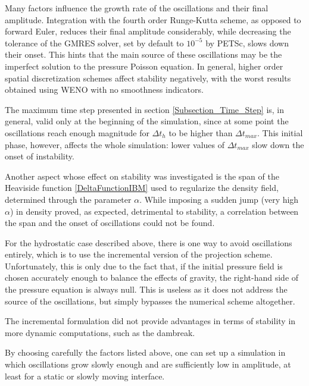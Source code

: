 \documentclass[11pt, a4paper, oneside, openany]{book}
\begin{document}
Many factors influence the growth rate of the oscillations and their final amplitude. Integration with the fourth order Runge-Kutta scheme, as opposed to forward Euler, reduces their final amplitude considerably, while decreasing the tolerance of the GMRES solver, set by default to $10^{-5}$ by PETSc, slows down their onset. This hints that the main source of these oscillations may be the imperfect solution to the pressure Poisson equation. In general, higher order spatial discretization schemes affect stability negatively, with the worst results obtained using WENO with no smoothness indicators.\par
The maximum time step presented in section \ref{Subsection_Time_Step} is, in general, valid only at the beginning of the simulation, since at some point the oscillations reach enough magnitude for $\Delta t_{h}$ to be higher than $\Delta t_{max}$. This initial phase, however, affects the whole simulation: lower values of $\Delta t_{max}$ slow down the onset of instability.\par
Another aspect whose effect on stability was investigated is the span of the Heaviside function \eqref{DeltaFunctionIBM} used to regularize the density field, determined through the parameter $\alpha$. While imposing a sudden jump (very high $\alpha$) in density proved, as expected, detrimental to stability, a correlation between the span and the onset of oscillations could not be found.\par
For the hydrostatic case described above, there is one way to avoid oscillations entirely, which is to use the incremental version of the projection scheme. Unfortunately, this is only due to the fact that, if the initial pressure field is chosen accurately enough to balance the effects of gravity, the right-hand side of the pressure equation is always null. This is useless as it does not address the source of the oscillations, but simply bypasses the numerical scheme altogether.\par
The incremental formulation did not provide advantages in terms of stability in more dynamic computations, such as the dambreak.\par
By choosing carefully the factors listed above, one can set up a simulation in which oscillations grow slowly enough and are sufficiently low in amplitude, at least for a static or slowly moving interface.
\end{document}
